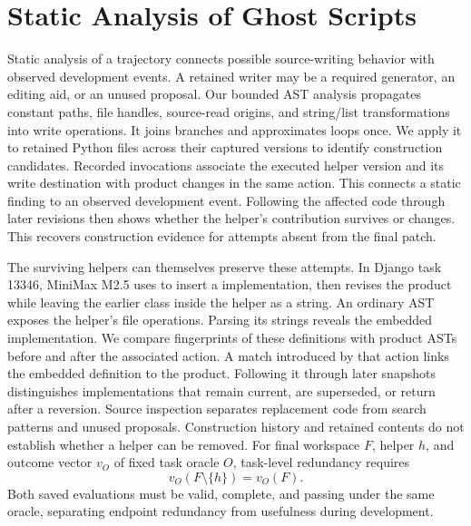 \documentclass[10pt,conference]{IEEEtran}
\newcommand{\code}[1]{\mbox{\texttt{\detokenize{#1}}}}
\begin{document}
\section{Static Analysis of Ghost Scripts}
\label{sec:static}
\label{sec:ghost}
Static analysis of a trajectory connects possible source-writing behavior with observed development events. A retained writer may be a required generator, an editing aid, or an unused proposal. Our bounded AST analysis propagates constant paths, file handles, source-read origins, and string/list transformations into write operations. It joins branches and approximates loops once. We apply it to retained Python files across their captured versions to identify construction candidates. Recorded invocations associate the executed helper version and its write destination with product changes in the same action. This connects a static finding to an observed development event. Following the affected code through later revisions then shows whether the helper's contribution survives or changes. This recovers construction evidence for attempts absent from the final patch.

The surviving helpers can themselves preserve these attempts. In Django task 13346, MiniMax M2.5 uses \code{/tmp/patch2.py} to insert a \code{KeyTransformIn} implementation, then revises the product while leaving the earlier class inside the helper as a string. An ordinary AST exposes the helper's file operations. Parsing its strings reveals the embedded implementation. We compare fingerprints of these definitions with product ASTs before and after the associated action. A match introduced by that action links the embedded definition to the product. Following it through later snapshots distinguishes implementations that remain current, are superseded, or return after a reversion. Source inspection separates replacement code from search patterns and unused proposals. Construction history and retained contents do not establish whether a helper can be removed. For final workspace $F$, helper $h$, and outcome vector $v_O$ of fixed task oracle $O$, task-level redundancy requires
\begin{equation}
v_O(F\setminus\{h\})=v_O(F).
\label{eq:redundancy}
\end{equation}
Both saved evaluations must be valid, complete, and passing under the same oracle, separating endpoint redundancy from usefulness during development.
\end{document}
